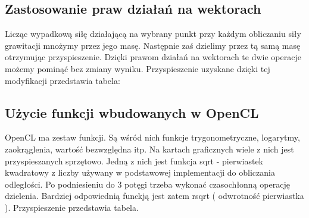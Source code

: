 \subsection { Zastosowanie praw działań na wektorach }
Licząc wypadkową siłę działającą na wybrany punkt przy każdym obliczaniu siły grawitacji mnożymy przez jego masę. Następnie zaś dzielimy przez tą samą masę otrzymując przyspieszenie. Dzięki prawom działań na wektorach te dwie operacje możemy pominąć bez zmiany wyniku. Przyspieszenie uzyskane dzięki tej modyfikacji przedstawia tabela:



\subsection { Użycie funkcji wbudowanych w OpenCL }
OpenCL ma zestaw funkcji. Są wśród nich funkcje trygonometryczne, logarytmy, zaokrąglenia, wartość bezwzględna itp. Na kartach graficznych wiele z nich jest przyspieszanych sprzętowo. Jedną z nich jest funkcja sqrt - pierwiastek kwadratowy z liczby używany w podstawowej implementacji do obliczania odległości. Po podniesieniu do 3 potęgi trzeba wykonać czasochłonną operację dzielenia. Bardziej odpowiednią funckją jest zatem rsqrt ( odwrotność pierwiastka ). Przyspieszenie przedstawia tabela.


